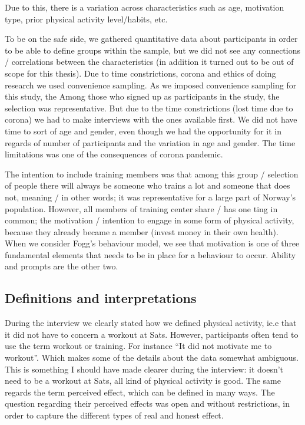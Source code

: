 Due to this, there is a variation across characteristics such as age, motivation type, prior physical activity level/habits, etc. 

To be on the safe side, we gathered quantitative data about participants in order to be able to define groups within the sample, but we did not see any connections / correlations between the characteristics (in addition it turned out to be out of scope for this thesis). 
Due to time constrictions, corona and ethics of doing research we used convenience sampling. As we imposed convenience sampling for this study, the 
Among those who signed up as participants in the study, the selection was representative. But due to the time constrictions (lost time due to corona) we had to make interviews with the ones available first. We did not have time to sort of age and gender, even though we had the opportunity for it in regards of number of participants and the variation in age and gender. The time limitations was one of the consequences of corona pandemic. 

The intention to include training members was that among this group / selection of people there will always be someone who trains a lot and someone that does not, meaning / in other words; it was representative for a large part of Norway's population. However, all members of training center share / has one ting in common; the motivation / intention to engage in some form of physical activity, because they already became a member (invest money in their own health). When we consider Fogg's behaviour model, we see that motivation is one of three fundamental elements that needs to be in place for a behaviour to occur. Ability and prompts are the other two. 

\subsection{Definitions and interpretations }
During the interview we clearly stated how we defined physical activity, ie.e that it did not have to concern a workout at Sats. However, participants often tend to use the term workout or training. For instance “It did not motivate me to workout”. Which makes some of the details about the data somewhat ambiguous. This is something I should have made clearer during the interview: it doesn't need to be a workout at Sats, all kind of physical activity is good.
The same regards the term perceived effect, which can be defined in many ways. The question regarding their perceived effects was open and without restrictions, in order to capture the different types of real and honest effect.


